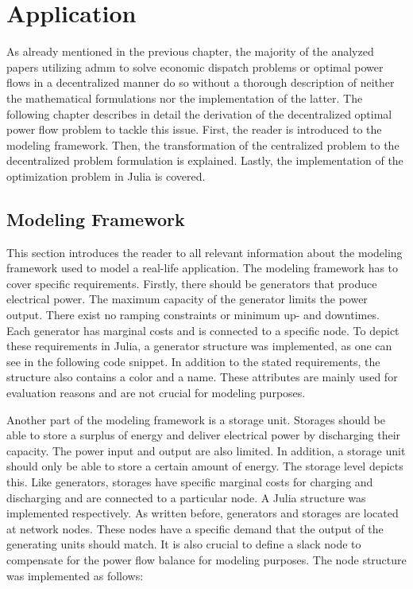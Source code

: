 \section{Application}
\label{sec:app}

As already mentioned in the previous chapter, the majority of the analyzed papers utilizing \gls{admm} to solve economic dispatch problems or optimal power flows in a decentralized manner do so without a thorough description of neither the mathematical formulations nor the implementation of the latter. The following chapter describes in detail the derivation of the decentralized optimal power flow problem to tackle this issue. First, the reader is introduced to the modeling framework. Then, the transformation of the centralized problem to the decentralized problem formulation is explained. Lastly, the implementation of the optimization problem in Julia is covered.

\subsection{Modeling Framework}
\label{sec:app:mod-framework}

This section introduces the reader to all relevant information about the modeling framework used to model a real-life application. The modeling framework has to cover specific requirements. Firstly, there should be generators that produce electrical power. The maximum capacity of the generator limits the power output. There exist no ramping constraints or minimum up- and downtimes. Each generator has marginal costs and is connected to a specific node. To depict these requirements in Julia, a generator structure was implemented, as one can see in the following code snippet. In addition to the stated requirements, the structure also contains a color and a name. These attributes are mainly used for evaluation reasons and are not crucial for modeling purposes. 



Another part of the modeling framework is a storage unit. Storages should be able to store a surplus of energy and deliver electrical power by discharging their capacity. The power input and output are also limited. In addition, a storage unit should only be able to store a certain amount of energy. The storage level depicts this. Like generators, storages have specific marginal costs for charging and discharging and are connected to a particular node. A Julia structure was implemented respectively. As written before, generators and storages are located at network nodes. These nodes have a specific demand that the output of the generating units should match. It is also crucial to define a slack node to compensate for the power flow balance for modeling purposes. The node structure was implemented as follows:

